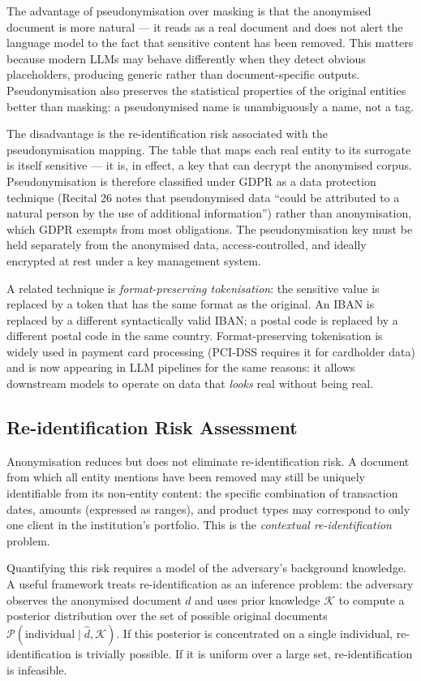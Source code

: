 The advantage of pseudonymisation over masking is that the anonymised document is more natural — it reads as a real document and does not alert the language model to the fact that sensitive content has been removed. This matters because modern LLMs may behave differently when they detect obvious placeholders, producing generic rather than document-specific outputs. Pseudonymisation also preserves the statistical properties of the original entities better than masking: a pseudonymised name is unambiguously a name, not a tag.

The disadvantage is the re-identification risk associated with the pseudonymisation mapping. The table that maps each real entity to its surrogate is itself sensitive — it is, in effect, a key that can decrypt the anonymised corpus. Pseudonymisation is therefore classified under GDPR as a data protection technique (Recital 26 notes that pseudonymised data ``could be attributed to a natural person by the use of additional information'') rather than anonymisation, which GDPR exempts from most obligations. The pseudonymisation key must be held separately from the anonymised data, access-controlled, and ideally encrypted at rest under a key management system.

A related technique is \emph{format-preserving tokenisation}: the sensitive value is replaced by a token that has the same format as the original. An IBAN is replaced by a different syntactically valid IBAN; a postal code is replaced by a different postal code in the same country. Format-preserving tokenisation is widely used in payment card processing (PCI-DSS requires it for cardholder data) and is now appearing in LLM pipelines for the same reasons: it allows downstream models to operate on data that \emph{looks} real without being real.

\subsection{Re-identification Risk Assessment}
\label{sec:ch15-reidentification}

Anonymisation reduces but does not eliminate re-identification risk. A document from which all entity mentions have been removed may still be uniquely identifiable from its non-entity content: the specific combination of transaction dates, amounts (expressed as ranges), and product types may correspond to only one client in the institution's portfolio. This is the \emph{contextual re-identification} problem.

Quantifying this risk requires a model of the adversary's background knowledge. A useful framework treats re-identification as an inference problem: the adversary observes the anonymised document $\hat{d}$ and uses prior knowledge $\mathcal{K}$ to compute a posterior distribution over the set of possible original documents $\mathcal{P}(\text{individual} \mid \hat{d}, \mathcal{K})$. If this posterior is concentrated on a single individual, re-identification is trivially possible. If it is uniform over a large set, re-identification is infeasible.

